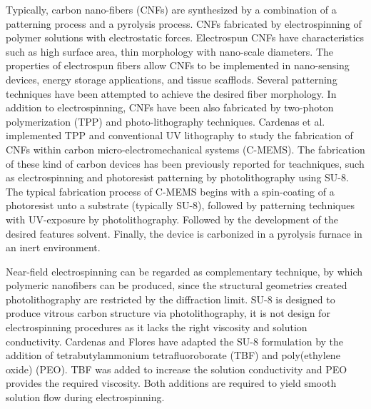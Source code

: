 Typically, carbon nano-fibers (CNFs) are synthesized by a combination of a patterning process and a pyrolysis process. CNFs fabricated by electrospinning of polymer solutions with electrostatic forces. Electrospun CNFs have characteristics such as high surface area, thin morphology with nano-scale diameters. The properties of electrospun fibers allow CNFs to be implemented in nano-sensing devices, energy storage applications, and tissue scafflods. \cite{Khanna2016, Ramakrishna2005, Reneker2000, Norris2000, Vozzi2002, Kim2003, Dersch2005} Several patterning techniques have been attempted to achieve the desired fiber morphology. In addition to electrospinning, CNFs have been also fabricated by two-photon polymerization (TPP) and photo-lithography techniques. \cite{CardenasBenitez2019} Cardenas et al. implemented TPP and conventional UV lithography to study the fabrication of CNFs within carbon micro-electromechanical systems (C-MEMS). The fabrication of these kind of carbon devices has been previously reported for teachniques, such as electrospinning and photoresist patterning by photolithography using SU-8. The typical fabrication process of C-MEMS begins with a spin-coating of a photoresist unto a substrate (typically SU-8), followed by patterning techniques with UV-exposure by photolithography. Followed by the development of the desired features solvent. Finally, the device is carbonized in a pyrolysis furnace in an inert environment. \cite{Pramanick2018a}

Near-field electrospinning can be regarded as complementary technique, by which polymeric nanofibers can be produced, since the structural geometries created photolithography are restricted by the diffraction limit. \cite{Pramanick2018a, Okazaki1991} SU-8 is designed to produce vitrous carbon structure via photolithography, it is not design for electrospinning procedures as it lacks the right viscosity and solution conductivity. Cardenas \cite{Cardenas2017} and Flores \cite{Flores2017} have adapted the SU-8 formulation by the addition of tetrabutylammonium tetrafluoroborate (TBF) and poly(ethylene oxide) (PEO). TBF was added to increase the solution conductivity and PEO provides the required viscosity. Both additions are required to yield smooth solution flow during electrospinning.

